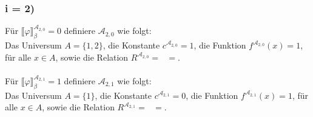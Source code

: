 \documentclass[12pt, a4paper]{article}
\newcommand{\lb}{\llbracket}
\newcommand{\rbb}{\rrbracket_{\beta}}
\begin{document}
\subsubsection*{i = 2)}
Für \(\lb \varphi \rbb^{\mathcal{A}_{2,0}} = 0\) definiere \(\mathcal{A}_{2,0}\) wie folgt:\\
Das Universum \(A = \{1,2\}\), die Konstante \(c^{\mathcal{A}_{2,0}} = 1\), die Funktion \(f^{\mathcal{A}_{2,0}}(x) = 1\), für alle \(x \in A\),
sowie die Relation \(R^{\mathcal{A}_{2,0}} = \text{ } =\).\\\\
Für \(\lb \varphi \rbb^{\mathcal{A}_{2,1}} = 1\) definiere \(\mathcal{A}_{2,1}\) wie folgt:\\
Das Universum \(A = \{1\}\), die Konstante \(c^{\mathcal{A}_{2,1}} = 0\), die Funktion \(f^{\mathcal{A}_{2,1}}(x) = 1\), für alle \(x \in A\),
sowie die Relation \(R^{\mathcal{A}_{2,1}} = \text{ } =\).
\end{document}
